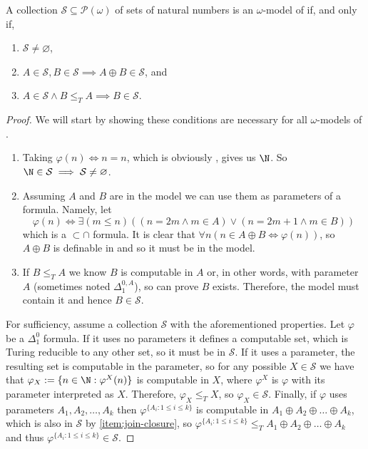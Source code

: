 \documentclass[../main.tex]{memoir}
\begin{document}
\begin{theorem}
  A collection $\mathcal{S} \subseteq \mathcal{P}(\omega)$ of sets of natural numbers is an $\omega$-model of \rca if, and only if,

  \begin{enumerate}
  \item $\mathcal{S} \neq \varnothing$,
  \item \label{item:join-closure} $A \in \mathcal{S}, B \in \mathcal{S} \implies A \oplus B \in \mathcal{S}$, and
  \item $A \in \mathcal{S} \land B \le_T A \implies B \in \mathcal{S}$.
  \end{enumerate}
\end{theorem}
\begin{proof}
  We will start by showing these conditions are necessary for all $\omega$-models of \rca.

  \begin{enumerate}
  \item Taking $\varphi(n) \iff n = n$, which is obviously \rec, gives us $\N$. So $\N \in \mathcal{S} \implies \mathcal{S} \neq \varnothing$.
  \item Assuming $A$ and $B$ are in the model we can use them as parameters of a formula. Namely, let
    \[ \varphi(n) \iff \exists (m \le n) ((n = 2m \land m \in A) \lor (n = 2m + 1 \land m \in B)) \]
    which is a $ \subset $$ \cap $ formula. It is clear that $\forall n (n \in A \oplus B \iff \varphi(n))$, so $A \oplus B$ is definable in \rca and so it must be in the model.
  \item If $B \le_T A$ we know $B$ is computable in $A$ or, in other words, \rec with parameter $A$ (sometimes noted $\Delta_{1}^{0,A}$), so \rca can prove $B$ exists. Therefore, the model must contain it and hence $B \in \mathcal{S}$.
  \end{enumerate}

  For sufficiency, assume a collection $\mathcal{S}$ with the aforementioned properties. Let $\varphi$ be a $\Delta_{1}^{0}$ formula. If it uses no parameters it defines a computable set, which is Turing reducible to any other set, so it must be in $\mathcal{S}$. If it uses a parameter, the resulting set is computable in the parameter, so for any possible $X \in \mathcal{S}$ we have that $\varphi_X := \{n \in \N: \varphi^X(n)\}$ is computable in $X$, where $\varphi^X$ is $\varphi$ with its parameter interpreted as $X$. Therefore, $\varphi_X \le_T X$, so $\varphi_X \in \mathcal{S}$. Finally, if $\varphi$ uses parameters $A_1, A_2, \ldots, A_k$ then $\varphi^{\{A_i: 1 \le i \le k\}}$ is computable in $A_1 \oplus A_2 \oplus \ldots \oplus A_k$, which is also in $\mathcal{S}$ by \ref{item:join-closure}, so $\varphi^{\{A_i: 1 \le i \le k\}} \le_T A_1 \oplus A_2 \oplus \ldots \oplus A_k$ and thus $\varphi^{\{A_i: 1 \le i \le k\}} \in \mathcal{S}$.
\end{proof}
\end{document}
